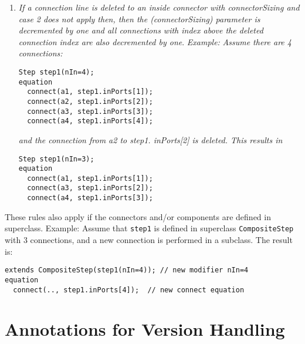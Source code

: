 \begin{example}
\begin{enumerate}
{  connection is performed. The result is:}
\begin{lstlisting}[language=modelica]
    Step step1(nIn=4); // index changed from nIn=3 to nIn=4
  equation
    connect(.., step1.inPorts[4]); // new connect equation
\end{lstlisting}
  \emph{In some applications, like state machines, the vector index is
  used as a priority, e.g., to define which transition is firing if
  several transitions become active at the same time instant. It is then
  not sufficient to only provide a mechanism to always connect to the
  last index. Instead, some mechanism to select an index conveniently
  should be provided. }
\item
  \emph{If a connection line is deleted to an inside connector with
  connectorSizing and case 2 does not apply then, then the
  (connectorSizing) parameter is decremented by one and all connections
  with index above the deleted connection index are also decremented by
  one}. \emph{Example:} \emph{Assume there are 4 connections:}
\begin{lstlisting}[language=modelica]
  Step step1(nIn=4);
equation
  connect(a1, step1.inPorts[1]);
  connect(a2, step1.inPorts[2]);
  connect(a3, step1.inPorts[3]);
  connect(a4, step1.inPorts[4]);
\end{lstlisting}
  \emph{and the connection from a2 to step1. inPorts{[}2{]} is deleted.
  This results in}
\begin{lstlisting}[language=modelica]
  Step step1(nIn=3);
equation
  connect(a1, step1.inPorts[1]);
  connect(a3, step1.inPorts[2]);
  connect(a4, step1.inPorts[3]);
\end{lstlisting}
\end{enumerate}

These rules also apply if the connectors and/or components are
defined in superclass. Example: Assume that \lstinline!step1! is defined in
superclass \lstinline!CompositeStep! with 3 connections, and a new connection is
performed in a subclass. The result is:
\begin{lstlisting}[language=modelica]
  extends CompositeStep(step1(nIn=4)); // new modifier nIn=4
equation
  connect(.., step1.inPorts[4]);  // new connect equation
\end{lstlisting}
\end{example}

\section{Annotations for Version Handling}

